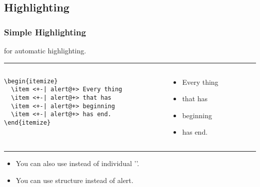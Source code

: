 \subsection{Highlighting}
\begin{frame}[fragile]
\frametitle{Simple Highlighting}%

  {\color{Violet}} for automatic highlighting.

\rule{\linewidth}{0.5mm}

  \begin{columns}
    \footnotesize
    \begin{column}{.5\textwidth}
      \begin{verbatim}
\begin{itemize}
  \item <+-| alert@+> Every thing
  \item <+-| alert@+> that has
  \item <+-| alert@+> beginning
  \item <+-| alert@+> has end.
\end{itemize}
      \end{verbatim}
    \end{column}

    \begin{column}{.3\textwidth}
      \begin{itemize}
        \item <+-| alert@+> Every thing
        \item <+-| alert@+> that has
        \item <+-| alert@+> beginning
        \item <+-| alert@+> has end.
      \end{itemize}
    \end{column}
  \end{columns}

\rule{\linewidth}{0.5mm}

  \begin{itemize}
    \item You can also use {\color{Violet}\path{\begin{itemize}[<+-|alert@+>]}} instead of individual '{\color{Violet}}'.
    \item You can use {\color{Violet}structure} instead of {\color{Violet}alert}.
  \end{itemize}

\end{frame}
